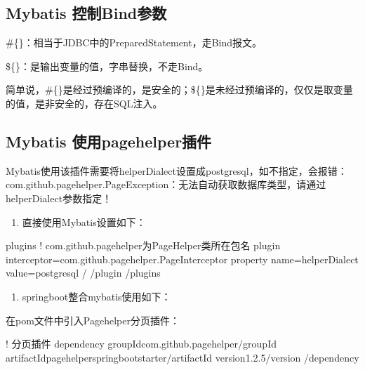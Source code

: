 \documentclass[letterpaper,10pt,english]{sphinxmanual}
\begin{document}
\subsection{Mybatis 控制Bind参数}
\label{\detokenize{interface/mybatis:mybatis-bind}}
\#\{\}：相当于JDBC中的PreparedStatement，走Bind报文。

\$\{\}：是输出变量的值，字串替换，不走Bind。

简单说，\#\{\}是经过预编译的，是安全的；\$\{\}是未经过预编译的，仅仅是取变量的值，是非安全的，存在SQL注入。


\subsection{Mybatis 使用pagehelper插件}
\label{\detokenize{interface/mybatis:mybatis-pagehelper}}
Mybatis使用该插件需要将helperDialect设置成postgresql，如不指定，会报错：com.github.pagehelper.PageException：无法自动获取数据库类型，请通过helperDialect参数指定！
\begin{enumerate}
%
\item {} 
直接使用Mybatis设置如下：

\end{enumerate}

\begin{sphinxVerbatim}[commandchars=\\\{\}]
\PYGZlt{}plugins\PYGZgt{}
           \PYGZlt{}!\PYGZhy{}\PYGZhy{} com.github.pagehelper为PageHelper类所在包名 \PYGZhy{}\PYGZhy{}\PYGZgt{}
           \PYGZlt{}plugin interceptor=\PYGZdq{}com.github.pagehelper.PageInterceptor\PYGZdq{}\PYGZgt{}
                    \PYGZlt{}property name=\PYGZdq{}helperDialect\PYGZdq{} value=\PYGZdq{}postgresql\PYGZdq{} /\PYGZgt{}
           \PYGZlt{}/plugin\PYGZgt{}
\PYGZlt{}/plugins\PYGZgt{}
\end{sphinxVerbatim}
\begin{enumerate}
%
\setcounter{enumi}{1}
\item {} 
springboot整合mybatis使用如下：

\end{enumerate}

在pom文件中引入Pagehelper分页插件：

\begin{sphinxVerbatim}[commandchars=\\\{\}]
\PYGZlt{}!\PYGZhy{}\PYGZhy{} 分页插件 \PYGZhy{}\PYGZhy{}\PYGZgt{}
\PYGZlt{}dependency\PYGZgt{}
    \PYGZlt{}groupId\PYGZgt{}com.github.pagehelper\PYGZlt{}/groupId\PYGZgt{}
    \PYGZlt{}artifactId\PYGZgt{}pagehelper\PYGZhy{}spring\PYGZhy{}boot\PYGZhy{}starter\PYGZlt{}/artifactId\PYGZgt{}
    \PYGZlt{}version\PYGZgt{}1.2.5\PYGZlt{}/version\PYGZgt{}
\PYGZlt{}/dependency\PYGZgt{}
\end{sphinxVerbatim}
\end{document}
